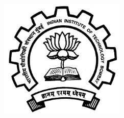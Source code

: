 \documentclass[a4paper, 12pt]{article}
\begin{document}
\begin{titlepage}
\includegraphics[width=6cm,keepaspectratio]{images/iitb_logo.png} %
 

\vfill %

\end{titlepage}
\end{document}
